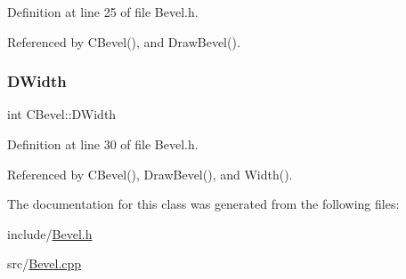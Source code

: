 Definition at line 25 of file Bevel.\+h.



Referenced by C\+Bevel(), and Draw\+Bevel().

\hypertarget{classCBevel_a891dccc1828c48e5e7a475ca33080060}{}\label{classCBevel_a891dccc1828c48e5e7a475ca33080060} 
\subsubsection{\texorpdfstring{D\+Width}{DWidth}}
{\footnotesize\ttfamily int C\+Bevel\+::\+D\+Width\hspace{0.3cm}{\ttfamily [protected]}}



Definition at line 30 of file Bevel.\+h.



Referenced by C\+Bevel(), Draw\+Bevel(), and Width().



The documentation for this class was generated from the following files\+:\begin{DoxyCompactItemize}
\item 
include/\hyperlink{Bevel_8h}{Bevel.\+h}\item 
src/\hyperlink{Bevel_8cpp}{Bevel.\+cpp}\end{DoxyCompactItemize}

